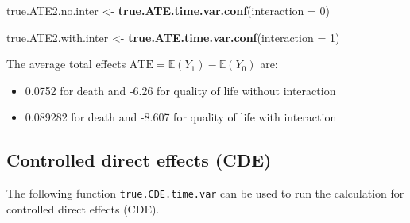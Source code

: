 \documentclass[
]{book}
\newenvironment{Shaded}{\begin{snugshade}}{\end{snugshade}}
\newcommand{\AttributeTok}[1]{\textcolor[rgb]{0.13,0.29,0.53}{#1}}
\newcommand{\DecValTok}[1]{\textcolor[rgb]{0.00,0.00,0.81}{#1}}
\newcommand{\FunctionTok}[1]{\textcolor[rgb]{0.13,0.29,0.53}{\textbf{#1}}}
\newcommand{\NormalTok}[1]{#1}
\newcommand{\OtherTok}[1]{\textcolor[rgb]{0.56,0.35,0.01}{#1}}
\providecommand{\tightlist}{%
  \setlength{\itemsep}{0pt}\setlength{\parskip}{0pt}}
\begin{document}
\begin{Shaded}
\begin{Highlighting}[]
\NormalTok{true.ATE2.no.inter }\OtherTok{\textless{}{-}} \FunctionTok{true.ATE.time.var.conf}\NormalTok{(}\AttributeTok{interaction =} \DecValTok{0}\NormalTok{)}

\NormalTok{true.ATE2.with.inter }\OtherTok{\textless{}{-}} \FunctionTok{true.ATE.time.var.conf}\NormalTok{(}\AttributeTok{interaction =} \DecValTok{1}\NormalTok{)}
\end{Highlighting}
\end{Shaded}

The average total effects \(\text{ATE} = \mathbb{E}(Y_1) - \mathbb{E}(Y_0)\) are:

\begin{itemize}
\tightlist
\item
  0.0752 for death and -6.26 for quality of life without interaction
\item
  0.089282 for death and -8.607 for quality of life with interaction
\end{itemize}

\hypertarget{controlled-direct-effects-cde-1}{%
\subsection{Controlled direct effects (CDE)}\label{controlled-direct-effects-cde-1}}

The following function \texttt{true.CDE.time.var} can be used to run the calculation for controlled direct effects (CDE).
\end{document}
